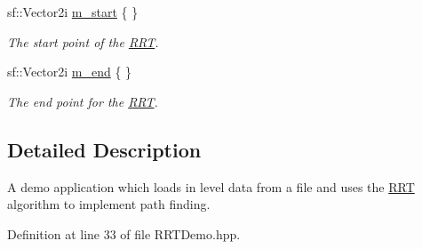 \begin{DoxyCompactItemize}
sf\+::\+Vector2i \hyperlink{classRRTDemo_ae776d26c1d8b700c878a572c6dcaa4c5}{m\+\_\+start} \{ \}
\begin{DoxyCompactList}\small\item\em The start point of the \hyperlink{classRRT}{R\+R\+T}. \end{DoxyCompactList}\item 
sf\+::\+Vector2i \hyperlink{classRRTDemo_a96344c80393991da942b99d30308a3da}{m\+\_\+end} \{ \}
\begin{DoxyCompactList}\small\item\em The end point for the \hyperlink{classRRT}{R\+R\+T}. \end{DoxyCompactList}\end{DoxyCompactItemize}


\subsection{Detailed Description}
A demo application which loads in level data from a file and uses the \hyperlink{classRRT}{R\+R\+T} algorithm to implement path finding. 



Definition at line 33 of file R\+R\+T\+Demo.\+hpp.



